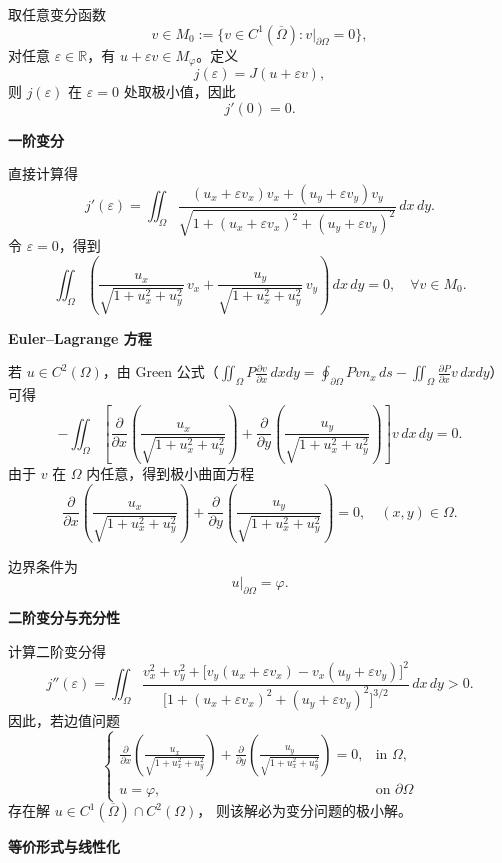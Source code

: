 \documentclass[12pt,a4paper]{ctexart}
\begin{document}
	取任意变分函数
	\[
	v\in M_0:=\{v\in C^1(\overline{\Omega}): v|_{\partial\Omega}=0\},
	\]
	对任意 $\varepsilon\in\mathbb{R}$，有 $u+\varepsilon v\in M_\varphi$。定义
	\[
	j(\varepsilon)=J(u+\varepsilon v),
	\]
	则 $j(\varepsilon)$ 在 $\varepsilon=0$ 处取极小值，因此
	\[
	j'(0)=0.
	\]
	
	\medskip
	\textbf{一阶变分}
	
	直接计算得
	\[
	j'(\varepsilon)
	= \iint_{\Omega}
	\frac{(u_x+\varepsilon v_x)v_x+(u_y+\varepsilon v_y)v_y}
	{\sqrt{1+(u_x+\varepsilon v_x)^2+(u_y+\varepsilon v_y)^2}}
	\,dx\,dy.
	\]
	令 $\varepsilon=0$，得到
	\[
	\iint_{\Omega}
	\left(
	\frac{u_x}{\sqrt{1+u_x^2+u_y^2}}\,v_x
	+
	\frac{u_y}{\sqrt{1+u_x^2+u_y^2}}\,v_y
	\right)\,dx\,dy
	=0,
	\quad \forall v\in M_0.
	\]
	
	\medskip
	\textbf{Euler--Lagrange 方程}
	
	若 $u\in C^2(\Omega)$，由 Green 公式（$\iint_{\Omega} P \frac{\partial v}{\partial x} \, dx dy = \oint_{\partial \Omega} P v n_x \, ds - \iint_{\Omega} \frac{\partial P}{\partial x} v \, dx dy$）可得
	\[
	-\iint_{\Omega}
	\left[
	\frac{\partial}{\partial x}
	\left(
	\frac{u_x}{\sqrt{1+u_x^2+u_y^2}}
	\right)
	+
	\frac{\partial}{\partial y}
	\left(
	\frac{u_y}{\sqrt{1+u_x^2+u_y^2}}
	\right)
	\right]v\,dx\,dy
	=0.
	\]
	由于 $v$ 在 $\Omega$ 内任意，得到极小曲面方程
	\[
	\frac{\partial}{\partial x}
	\left(
	\frac{u_x}{\sqrt{1+u_x^2+u_y^2}}
	\right)
	+
	\frac{\partial}{\partial y}
	\left(
	\frac{u_y}{\sqrt{1+u_x^2+u_y^2}}
	\right)
	=0,
	\quad (x,y)\in\Omega.
	\]
	
	边界条件为
	\[
	u|_{\partial\Omega}=\varphi.
	\]
	
	\medskip
	\textbf{二阶变分与充分性}
	
	计算二阶变分得
	\[
	j''(\varepsilon)
	=
	\iint_{\Omega}
	\frac{
		v_x^2+v_y^2+
		\big[v_y(u_x+\varepsilon v_x)-v_x(u_y+\varepsilon v_y)\big]^2
	}
	{\big[1+(u_x+\varepsilon v_x)^2+(u_y+\varepsilon v_y)^2\big]^{3/2}}
	\,dx\,dy
	>0.
	\]
	因此，若边值问题
	\[
	\begin{cases}
		\displaystyle
		\frac{\partial}{\partial x}
		\left(
		\frac{u_x}{\sqrt{1+u_x^2+u_y^2}}
		\right)
		+
		\frac{\partial}{\partial y}
		\left(
		\frac{u_y}{\sqrt{1+u_x^2+u_y^2}}
		\right)=0,
		& \text{in }\Omega,\\[1ex]
		u=\varphi, & \text{on }\partial\Omega
	\end{cases}
	\]
	存在解 $u\in C^1(\overline{\Omega})\cap C^2(\Omega)$，
	则该解必为变分问题的极小解。
	
	\medskip
	\textbf{等价形式与线性化}
	
\end{document}

